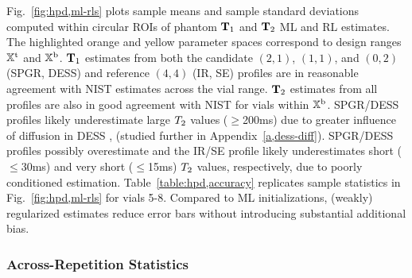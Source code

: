 Fig.~\ref{fig:hpd,ml-rls} plots 
sample means and sample standard deviations 
computed within circular ROIs 
of phantom $\mathbf{T}_1$ and $\mathbf{T}_2$ ML and RL estimates.
The highlighted orange and yellow parameter spaces 
correspond to design ranges $\mathbb{X}^\mathrm{t}$ and $\mathbb{X}^\mathrm{b}$.
$\mathbf{T}_1$ estimates from both 
the candidate $(2,1)$, $(1,1)$, and $(0,2)$ (SPGR, DESS) 
and reference $(4,4)$ (IR, SE) profiles 
are in reasonable agreement 
with NIST estimates \cite{keenan:16:msm} 
across the vial range.
$\mathbf{T}_2$ estimates from all profiles are also 
in good agreement with NIST 
for vials within $\mathbb{X}^\mathrm{b}$.
SPGR/DESS profiles likely underestimate large $T_2$ values ($\ge$200ms) 
due to greater influence of diffusion in DESS 
\cite{carney:91:asa, wu:90:eod, kaiser:74:daf},
(studied further in Appendix~\ref{a,dess-diff}).
SPGR/DESS profiles possibly overestimate 
and the IR/SE profile likely underestimates 
short ($\le$30ms) and very short ($\le$15ms) $T_2$ values, 
respectively, 
due to poorly conditioned estimation. 
Table~\ref{table:hpd,accuracy} replicates sample statistics 
in Fig.~\ref{fig:hpd,ml-rls} for vials 5-8.
Compared to ML initializations, 
(weakly) regularized estimates reduce error bars 
without introducing substantial additional bias.

\subsubsection{Across-Repetition Statistics} 
\label{sss,scn-dsgn,exp,phant,rep}

